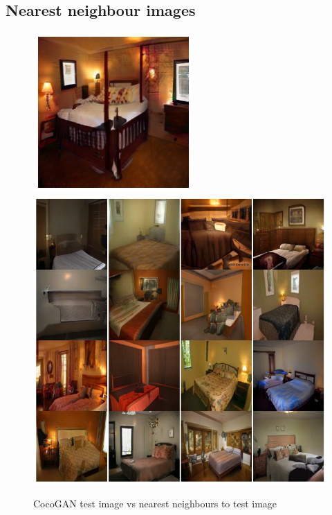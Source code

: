 \documentclass{article}
\begin{document}
    \subsection{Nearest neighbour images}
    \begin{figure}[H]
          \centering
          \includegraphics[scale=0.5]{nearest-neighbour/coco_test_image.png}
          \ \ 
          \includegraphics[scale=0.3]{nearest-neighbour/coco_nearest_images.png}\\
          \caption{CocoGAN test image vs nearest neighbours to test image}
    \end{figure}
\end{document}
